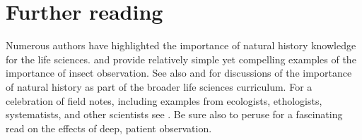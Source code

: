 \documentclass[letterpaper, 11pt]{article}
\begin{document}
\section*{Further reading}
Numerous authors have highlighted the importance of natural history knowledge for the life sciences. \cite{agrawal2014} and \cite{wilcoveeisner2000} provide relatively simple yet compelling examples of the importance of insect observation. See also \cite{Schmidly449} and \cite{Barrows13042016} for discussions of the importance of natural history as part of the broader life sciences curriculum. For a celebration of field notes, including examples from ecologists, ethologists, systematists, and other scientists see \cite{canfield2011field}. Be sure also to peruse \cite{roberts2013} for a fascinating read on the effects of deep, patient observation.



\end{document}

